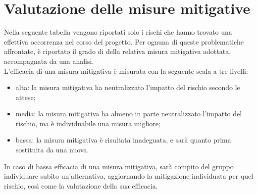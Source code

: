 \section{Valutazione delle misure mitigative}
Nella seguente tabella vengono riportati solo i rischi che hanno trovato una effettiva occorrenza nel corso del progetto. Per ognuna di queste problematiche affrontate, è riportato il grado di  della relativa misura mitigativa adottata, accompagnata da una analisi.\\
L'efficacia di una misura mitigativa è misurata con la seguente scala a tre livelli:
\begin{itemize}
    \item alta: la misura mitigativa ha neutralizzato l'impatto del rischio secondo le attese;
    \item media: la misura mitigativa ha almeno in parte neutralizzato l'impatto del rischio, ma è individuabile una misura migliore;
    \item bassa: la misura mitigativa è risultata inadeguata, e sarà quanto prima sostituita da una nuova.
\end{itemize}
In caso di bassa efficacia di una misura mitigativa, sarà compito del gruppo individuare subito un'alternativa, aggiornando la mitigazione individuata per quel rischio, così come la valutazione della sua efficacia.\\ \\

